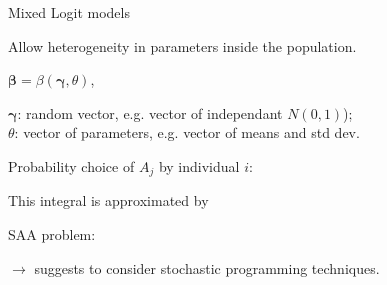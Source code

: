 \documentclass{beamer}
\def\bxi{\boldsymbol\xi}
\begin{document}
	\begin{frame}{Mixed Logit models}
		
		\begin{footnotesize}
			Allow {\red heterogeneity} in parameters inside the population.
			\begin{center}
				$\boldsymbol{\beta} = \beta(\boldsymbol{\gamma}, \theta)$,
			\end{center}
			$\boldsymbol{\gamma}$: {\blue random vector}, e.g. vector of independant
			$N(0,1)$);\\
			$\theta$: {\blue vector of parameters}, e.g. vector of means and std dev.
			
				Probability choice of $A_j$ by individual $i$:
				\begin{center}
					\psframebox[fillstyle=solid, fillcolor=lightgray]{
						$P_{ij} (\theta) = E_{\bxi} \left[ L_{ij} (\gamma, \theta)\ \right] =
						\int { L_{ij} (\gamma, \theta)} f(\gamma) d\gamma$
					}
				\end{center}
				
				This integral is approximated by
				\begin{center}
				\end{center}

				{\red SAA} problem:
				\begin{center}
				\end{center}
			
				$\rightarrow$ suggests to consider {\blue stochastic programming}
				techniques.
			
		\end{footnotesize}
		
\end{frame}
\end{document}
